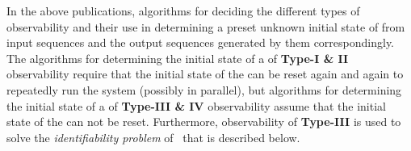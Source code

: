 \begin{itemize}
\end{itemize}

In the above publications, algorithms for deciding the different types of observability  and their use in determining a preset unknown initial state of  {\BCN}  from input sequences and the output sequences generated by them correspondingly. The algorithms for determining  the initial state of a {\BCN} of {\bf Type-I \& II} observability require that the initial state of the {\BCN} can be reset again and again to repeatedly run the system (possibly in parallel), but  algorithms for determining  the initial state of a {\BCN} of {\bf Type-III \& IV}  observability assume that the initial state of the {\BCN} can not be reset. Furthermore,  observability of {\bf Type-III}  is used to solve the  {\em identifiability problem} of \BCNs\, that is described below.

